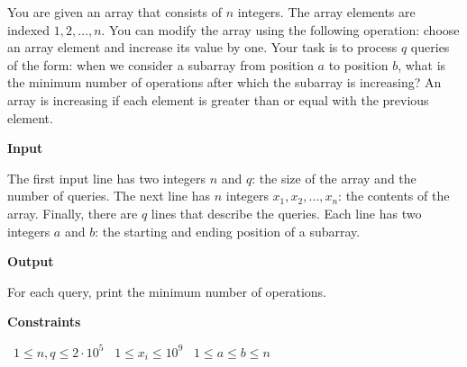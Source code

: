 You are given an array that consists of $n$ integers. The array elements are indexed $1,2,\dots,n$.
You can modify the array using the following operation: choose an array element and increase its value by one.
Your task is to process $q$ queries of the form: when we consider a subarray from position $a$ to position $b$, what is the minimum number of operations after which the subarray is increasing?
An array is increasing if each element is greater than or equal with the previous element.

\vspace{0.3cm}\noindent\textbf{Input}

The first input line has two integers $n$ and $q$: the size of the array and the number of queries.
The next line has $n$ integers $x_1,x_2,\dots,x_n$: the contents of the array.
Finally, there are $q$ lines that describe the queries. Each line has two integers $a$ and $b$: the starting and ending position of a subarray.

\vspace{0.3cm}\noindent\textbf{Output}

For each query, print the minimum number of operations.

\vspace{0.3cm}\noindent\textbf{Constraints}

\textbullet\ $1 \le n,q \le 2\cdot10^5$
\textbullet\ $1 \le x_i \le 10^9$
\textbullet\ $1 \le a \le b \le n$